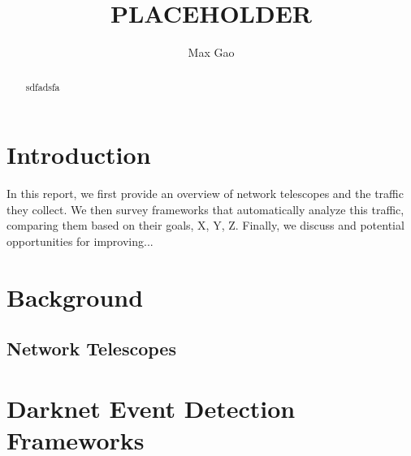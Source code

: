 \documentclass[manuscript,nonacm]{acmart}
\begin{document}
\title{PLACEHOLDER}
\author{Max Gao}

\begin{abstract}
sdfadsfa
\end{abstract}

\maketitle

\section{Introduction}

In this report, we first provide an overview of network telescopes and the traffic they collect. 
We then survey frameworks that automatically analyze this traffic, comparing them based on their goals, X, Y, Z.
Finally, we discuss and potential opportunities for improving...

\section{Background}

\subsection{Network Telescopes}

\section{Darknet Event Detection Frameworks}
\end{document}

